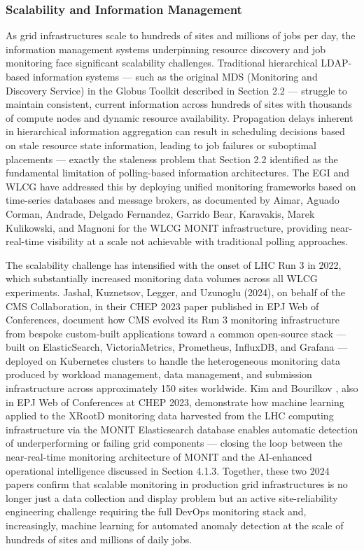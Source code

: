 \documentclass[12pt,a4paper]{report}
\begin{document}
\subsubsection*{Scalability and Information Management}
As grid infrastructures scale to hundreds of sites and millions of jobs per day, the information management systems underpinning resource discovery 
and job monitoring face significant scalability challenges. Traditional hierarchical LDAP-based information systems — such as the original MDS
 (Monitoring and Discovery Service) in the Globus Toolkit described in Section 2.2 — struggle to maintain consistent, current information across 
 hundreds of sites with thousands of compute nodes and dynamic resource availability. Propagation delays inherent in hierarchical information 
 aggregation can result in scheduling decisions based on stale resource state information, leading to job failures or suboptimal placements — exactly 
 the staleness problem that Section 2.2 identified as the fundamental limitation of polling-based information architectures. The EGI and WLCG have 
 addressed this by deploying unified monitoring frameworks based on time-series databases and message brokers, as documented by Aimar, Aguado Corman, 
 Andrade, Delgado Fernandez, Garrido Bear, Karavakis, Marek Kulikowski, and Magnoni \parencite{aimar2019monit} for the WLCG MONIT infrastructure, providing near-real-time
  visibility at a scale not achievable with traditional polling approaches. 
  
  The scalability challenge has intensified with the onset of LHC Run 3 in 2022, 
  which substantially increased monitoring data volumes across all WLCG experiments. Jashal, Kuznetsov, Legger, and Uzunoglu (2024), on behalf of the
   CMS Collaboration, in their CHEP 2023 paper published in EPJ Web of Conferences, document how CMS evolved its Run 3 monitoring infrastructure from 
   bespoke custom-built applications toward a common open-source stack — built on ElasticSearch, VictoriaMetrics, Prometheus, InfluxDB, and 
   Grafana — deployed on Kubernetes clusters to handle the heterogeneous monitoring data produced by workload management, data management, and 
   submission infrastructure across approximately 150 sites worldwide. Kim and Bourilkov \parencite{kim2024}, also in EPJ Web of Conferences at CHEP 2023,
    demonstrate how machine learning applied to the XRootD monitoring data harvested from the LHC computing infrastructure via the MONIT Elasticsearch 
    database enables automatic detection of underperforming or failing grid components — closing the loop between the near-real-time monitoring 
    architecture of MONIT and the AI-enhanced operational intelligence discussed in Section 4.1.3. Together, these two 2024 papers confirm that 
    scalable monitoring in production grid infrastructures is no longer just a data collection and display problem but an active site-reliability
     engineering challenge requiring the full DevOps monitoring stack and, increasingly, machine learning for automated anomaly detection at the 
     scale of hundreds of sites and millions of daily jobs.
\end{document}
